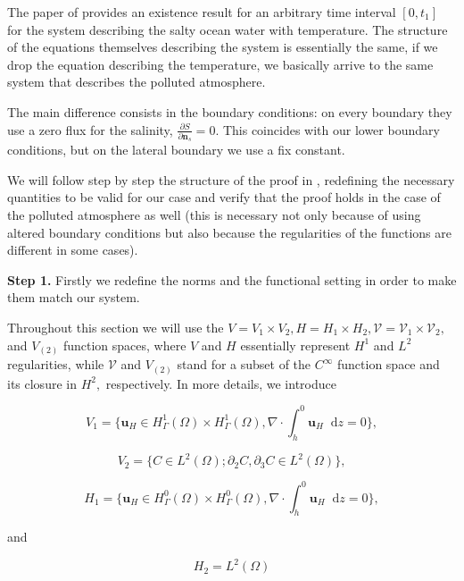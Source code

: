 \documentclass[11pt]{article}
\newcommand*\diff{\mathop{}\!\mathrm{d}}
\begin{document}
The paper of \cite{temam2005some} provides an existence result for an arbitrary time interval $[0, t_1]$ for the system describing the salty ocean water with temperature. The structure of the equations themselves describing the system is essentially the same, if we drop the equation describing the temperature, we basically arrive to the same system that describes the polluted atmosphere.

The main difference consists in the boundary conditions: on every boundary they use a zero flux for the salinity, $\frac{\partial S}{\partial \mathbf{n}_s} = 0$. This coincides with our lower boundary conditions, but on the lateral boundary we use a fix constant.

We will follow step by step the structure of the proof in \cite{temam2005some}, redefining the necessary quantities to be valid for our case and verify that the proof holds in the case of the polluted atmosphere as well (this is necessary not only because of using altered boundary conditions but also because the regularities of the functions are different in some cases).

\textbf{Step 1.} Firstly we redefine the norms and the functional setting in order to make them match our system.

Throughout this section we will use the $V = V_1 \times V_2, H = H_1 \times H_2, \mathcal{V} = \mathcal{V}_1 \times \mathcal{V}_2,$ and $V_{(2)}$ function spaces, where $V$ and $H$ essentially represent $H^1$ and $L^2$ regularities, while $\mathcal{V}$ and $V_{(2)}$ stand for a subset of the $C^{\infty}$ function space and its closure in $H^2,$ respectively. In more details, we introduce

$$ V_1 = \{ \mathbf{u}_H \in H^1_\Gamma (\Omega) \times H^1_\Gamma (\Omega), \nabla \cdot \int_h^0 \mathbf{u}_H \diff z = 0  \}, $$

$$ V_2 = \{ C \in L^2(\Omega); \partial_2 C, \partial_3 C \in L^2(\Omega)\}, $$

$$ H_1 =  \{ \mathbf{u}_H \in H^0_\Gamma (\Omega) \times H^0_\Gamma (\Omega), \nabla \cdot \int_h^0 \mathbf{u}_H \diff z = 0  \}, $$

and

$$ H_2 = L^2(\Omega) $$
\end{document}
